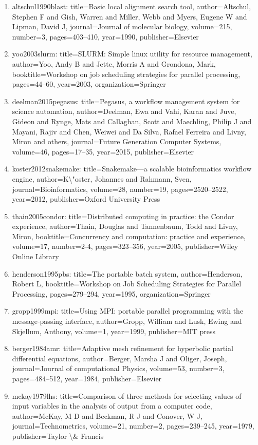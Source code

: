 \documentclass[11pt]{article}
\begin{document}
\begin{enumerate}[leftmargin=*]
  \item altschul1990blast: title=Basic local alignment search tool, author=Altschul, Stephen F and Gish, Warren and Miller, Webb and Myers, Eugene W and Lipman, David J, journal=Journal of molecular biology, volume=215, number=3, pages=403--410, year=1990, publisher=Elsevier
  \item yoo2003slurm: title=SLURM: Simple linux utility for resource management, author=Yoo, Andy B and Jette, Morris A and Grondona, Mark, booktitle=Workshop on job scheduling strategies for parallel processing, pages=44--60, year=2003, organization=Springer
  \item deelman2015pegasus: title=Pegasus, a workflow management system for science automation, author=Deelman, Ewa and Vahi, Karan and Juve, Gideon and Rynge, Mats and Callaghan, Scott and Maechling, Philip J and Mayani, Rajiv and Chen, Weiwei and Da Silva, Rafael Ferreira and Livny, Miron and others, journal=Future Generation Computer Systems, volume=46, pages=17--35, year=2015, publisher=Elsevier
  \item koster2012snakemake: title=Snakemake—a scalable bioinformatics workflow engine, author=K\textbackslash{}"oster, Johannes and Rahmann, Sven, journal=Bioinformatics, volume=28, number=19, pages=2520--2522, year=2012, publisher=Oxford University Press
  \item thain2005condor: title=Distributed computing in practice: the Condor experience, author=Thain, Douglas and Tannenbaum, Todd and Livny, Miron, booktitle=Concurrency and computation: practice and experience, volume=17, number=2-4, pages=323--356, year=2005, publisher=Wiley Online Library
  \item henderson1995pbs: title=The portable batch system, author=Henderson, Robert L, booktitle=Workshop on Job Scheduling Strategies for Parallel Processing, pages=279--294, year=1995, organization=Springer
  \item gropp1999mpi: title=Using MPI: portable parallel programming with the message-passing interface, author=Gropp, William and Lusk, Ewing and Skjellum, Anthony, volume=1, year=1999, publisher=MIT press
  \item berger1984amr: title=Adaptive mesh refinement for hyperbolic partial differential equations, author=Berger, Marsha J and Oliger, Joseph, journal=Journal of computational Physics, volume=53, number=3, pages=484--512, year=1984, publisher=Elsevier
  \item mckay1979lhs: title=Comparison of three methods for selecting values of input variables in the analysis of output from a computer code, author=McKay, M D and Beckman, R J and Conover, W J, journal=Technometrics, volume=21, number=2, pages=239--245, year=1979, publisher=Taylor \textbackslash{}\& Francis

\end{enumerate}
\end{document}

